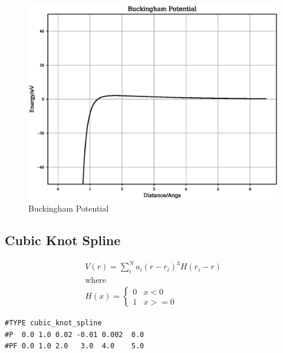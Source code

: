 \documentclass[12pt,twoside]{manual}
\begin{document}
\begin{appendices}
\FloatBarrier
\begin{figure}[h]
  \begin{center}
    \includegraphics[scale=0.5]{img/plots/buckingham.eps}
    \caption{Buckingham Potential}
    \label{graph:graph1}
  \end{center}
\end{figure}
\FloatBarrier







\subsection{Cubic Knot Spline}

\begin{equation}
\begin{split}
V(r) = \sum_i^N a_i (r - r_i)^3 H(r_i - r) \\
\text{where } \\
H(x) = \left\{ \begin{matrix} 0 & x<0 \\  1 & x >= 0 \end{matrix} \right . 
\end{split}
\label{eq:cubicKnotSpline}
\end{equation}


\begin{lstlisting}[style=pseudocode,caption={Cubic Knot Spline}]
#TYPE cubic_knot_spline
#P  0.0 1.0 0.02 -0.01 0.002  0.0
#PF 0.0 1.0 2.0   3.0  4.0    5.0
\end{lstlisting}


\end{appendices}
\end{document}
